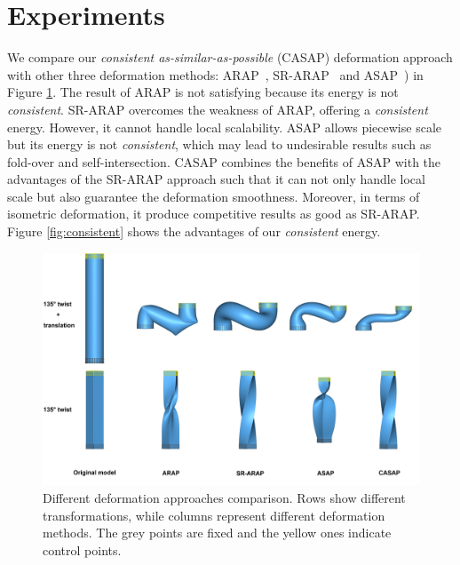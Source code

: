 \section{Experiments}
We compare our \emph{consistent as-similar-as-possible} (CASAP) deformation approach with other three deformation methods: ARAP~\citep{sorkine2007rigid}, SR-ARAP~\citep{levi2015smooth} and ASAP~\citep{yamazaki2013non}) in Figure \ref{fig:deformation_comparison}. The result of ARAP is not satisfying because its energy is not \emph{consistent}. SR-ARAP overcomes the weakness of ARAP, offering a \emph{consistent} energy. However, it cannot handle local scalability. ASAP allows piecewise scale but its energy is not \emph{consistent}, which may lead to undesirable results such as fold-over and self-intersection. CASAP combines the benefits of ASAP with the advantages of the SR-ARAP approach such that it can not only handle local scale but also guarantee the deformation smoothness. Moreover, in terms of isometric deformation, it produce competitive results as good as SR-ARAP. Figure \ref{fig:consistent} shows the advantages of our \emph{consistent} energy.\\
 \begin{figure}[!hptb]
 \centering

 \captionsetup[subfigure]{labelformat=empty}
 \centering

			\includegraphics[width=\columnwidth]{./figure/deformation_comparison.png}


     \caption{Different deformation approaches comparison. Rows show different transformations, while columns represent different deformation methods. The grey points are fixed and the yellow ones indicate control points.  }
     \label{fig:deformation_comparison}
 \end{figure}

